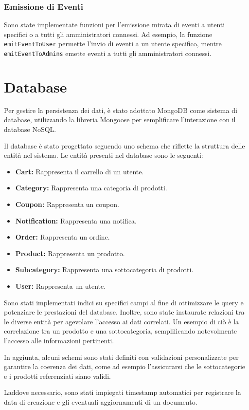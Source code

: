 \subsubsection{Emissione di Eventi}

Sono state implementate funzioni per l'emissione mirata di eventi a utenti specifici o a tutti gli amministratori connessi. Ad esempio, la funzione \texttt{emitEventToUser} permette l'invio di eventi a un utente specifico, mentre \texttt{emitEventToAdmins} emette eventi a tutti gli amministratori connessi.


\section{Database}
Per gestire la persistenza dei dati, è stato adottato MongoDB come sistema di database, utilizzando la libreria Mongoose per semplificare l'interazione con il database NoSQL.

Il database è stato progettato seguendo uno schema che riflette la struttura delle entità nel sistema.
Le entità presenti nel database sono le seguenti:
\begin{itemize}
    \item \textbf{Cart:} Rappresenta il carrello di un utente.
    \item \textbf{Category:} Rappresenta una categoria di prodotti.
    \item \textbf{Coupon:} Rappresenta un coupon.
    \item \textbf{Notification:} Rappresenta una notifica.
    \item \textbf{Order:} Rappresenta un ordine.
    \item \textbf{Product:} Rappresenta un prodotto.
    \item \textbf{Subcategory:} Rappresenta una sottocategoria di prodotti.
    \item \textbf{User:} Rappresenta un utente.
\end{itemize}

Sono stati implementati indici su specifici campi al fine di ottimizzare le query e potenziare le prestazioni del database. Inoltre, sono state instaurate relazioni tra le diverse entità per agevolare l'accesso ai dati correlati. Un esempio di ciò è la correlazione tra un prodotto e una sottocategoria, semplificando notevolmente l'accesso alle informazioni pertinenti.

In aggiunta, alcuni schemi sono stati definiti con validazioni personalizzate per garantire la coerenza dei dati, come ad esempio l'assicurarsi che le sottocategorie e i prodotti referenziati siano validi.

Laddove necessario, sono stati impiegati timestamp automatici per registrare la data di creazione e gli eventuali aggiornamenti di un documento.
